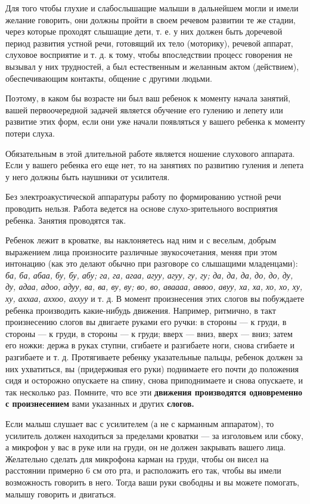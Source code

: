 \documentclass{book}
\renewcommand{\emph}[1]{\textit{#1}}
\begin{document}
Для того чтобы глухие и слабослышащие малыши в дальнейшем могли и имели
желание говорить, они должны пройти в своем речевом развитии те же
стадии, через которые проходят слышащие дети, т. е. у них должен быть
доречевой период развития устной речи, готовящий их тело (моторику),
речевой аппарат, слуховое восприятие и т. д. к тому, чтобы впоследствии
процесс говорения не вызывал у них трудностей, а был естественным и
желанным актом (действием), обеспечивающим контакты, общение с другими
людьми.

Поэтому, в каком бы возрасте ни был ваш ребенок к моменту начала
занятий, вашей первоочередной задачей является обучение его гулению и
лепету или развитие этих форм, если они уже начали появляться у вашего
ребенка к моменту потери слуха.

Обязательным в этой длительной работе является ношение слухового
аппарата. Если у вашего ребенка его еще нет, то на занятиях по развитию
гуления и лепета у него должны быть наушники от усилителя.

Без электроакустической аппаратуры работу по формированию устной речи
проводить нельзя. Работа ведется на основе слухо-зрительного восприятия
ребенка. Занятия проводятся так.

Ребенок лежит в кроватке, вы наклоняетесь над ним и с веселым, добрым
выражением лица произносите различные звукосочетания, меняя при этом
интонацию (как это делают обычно при разговоре со слышащими младенцами):
\emph{ба, ба, абаа, бу, бу, абу; га, га, агаа, агуу, агуу, гу, гу; да,
да, да, до, до, ду, ду, адаа, адоо, адуу, ва, ва, ву, ву; во, во,
аваааа, аввоо, авуу, ха, ха, хо, хо, ху, ху, аххаа, аххоо, аххуу} и т.
д. В момент произнесения этих слогов вы побуждаете ребенка производить
какие-нибудь движения. Например, ритмично, в такт произнесению слогов вы
двигаете руками его ручки: в стороны --- к груди, в стороны --- к груди,
в стороны --- к груди; вверх --- вниз, вверх --- вниз; затем его ножки:
держа в руках ступни, сгибаете и разгибаете ноги, снова сгибаете и
разгибаете и т. д. Протягиваете ребенку указательные пальцы, ребенок
должен за них ухватиться, вы (придерживая его руки) поднимаете его почти
до положения сидя и осторожно опускаете на спину, снова приподнимаете и
снова опускаете, и так несколько раз. Помните, что все эти
\textbf{движения производятся одновременно с произнесением} вами
указанных и других \textbf{слогов.}

Если малыш слушает вас с усилителем (а не с карманным аппаратом), то
усилитель должен находиться за пределами кроватки --- за изголовьем или
сбоку, а микрофон у вас в руке или на груди, он не должен закрывать
вашего лица. Желательно сделать для микрофона карман на груди, чтобы он
висел на расстоянии примерно 6 см ото рта, и расположить его так, чтобы
вы имели возможность говорить в него. Тогда ваши руки свободны и вы
можете помогать, малышу говорить и двигаться.
\end{document}
